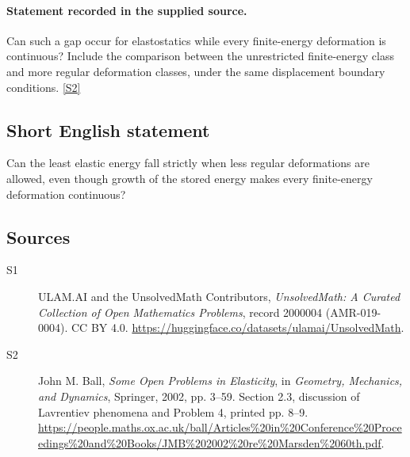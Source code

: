 \documentclass[11pt]{book}
\newcommand{\sref}[2]{\hyperlink{source:#1:#2}{[S#2]}}
\begin{document}
\paragraph{Statement recorded in the supplied source.}
Can such a gap occur for elastostatics while every finite-energy deformation is continuous? Include the comparison between the unrestricted finite-energy class and more regular deformation classes, under the same displacement boundary conditions. \sref{2000004}{2}
\subsection{Short English statement}
Can the least elastic energy fall strictly when less regular deformations are allowed, even though growth of the stored energy makes every finite-energy deformation continuous?
\subsection{Sources}
\begin{description}
\item[\hypertarget{source:2000004:1}{S1}] ULAM.AI and the UnsolvedMath Contributors, \emph{UnsolvedMath: A Curated Collection of Open Mathematics Problems}, record 2000004 (AMR-019-0004). CC BY 4.0. \url{https://huggingface.co/datasets/ulamai/UnsolvedMath}.
\item[\hypertarget{source:2000004:2}{S2}] John M. Ball, \emph{Some Open Problems in Elasticity}, in \emph{Geometry, Mechanics, and Dynamics}, Springer, 2002, pp. 3--59. Section 2.3, discussion of Lavrentiev phenomena and Problem 4, printed pp. 8--9. \url{https://people.maths.ox.ac.uk/ball/Articles%20in%20Conference%20Proceedings%20and%20Books/JMB%202002%20re%20Marsden%2060th.pdf}.
\end{description}
\label{end:2000004}
\end{document}
